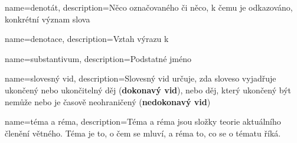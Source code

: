 {
	name=denotát,
	description={Něco označovaného či něco, k čemu je odkazováno, konkrétní význam slova}
}

{
	name=denotace,
	description={Vztah výrazu k }
}



{
	name=substantivum,
	description={Podstatné jméno}
}

{
	name=slovesný vid,
	description={Slovesný vid určuje, zda sloveso vyjadřuje ukončený nebo ukončitelný děj (\textbf{dokonavý vid}), nebo děj, který ukončený být nemůže nebo je časově neohraničený (\textbf{nedokonavý vid})}
}

{
	name=téma a réma,
	description={Téma a réma jsou složky teorie aktuálního členění větného. Téma je to, o čem se mluví, a réma to, co se o tématu říká. }
}

\makeglossaries